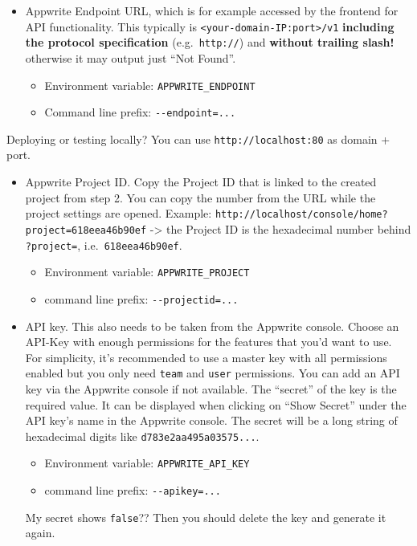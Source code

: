 \documentclass[
]{article}
\providecommand{\tightlist}{%
  \setlength{\itemsep}{0pt}\setlength{\parskip}{0pt}}
\begin{document}
\begin{itemize}
\item
  Appwrite Endpoint URL, which is for example accessed by the frontend
  for API functionality. This typically is
  \texttt{\textless{}your-domain-IP:port\textgreater{}/v1}
  \textbf{including the protocol specification} (e.g.~\texttt{http://})
  and \textbf{without trailing slash!} otherwise it may output just
  ``Not Found''.

  \begin{itemize}
  \tightlist
  \item
    Environment variable: \texttt{APPWRITE\_ENDPOINT}
  \item
    Command line prefix: \texttt{-\/-endpoint=...}
  \end{itemize}
\end{itemize}

Deploying or testing locally? You can use \texttt{http://localhost:80}
as domain + port.

\begin{itemize}
\item
  Appwrite Project ID. Copy the Project ID that is linked to the created
  project from step 2. You can copy the number from the URL while the
  project settings are opened. Example:
  \texttt{http://localhost/console/home?project=618eea46b90ef}
  -\textgreater{} the Project ID is the hexadecimal number behind
  \texttt{?project=}, i.e.~\texttt{618eea46b90ef}.

  \begin{itemize}
  \tightlist
  \item
    Environment variable: \texttt{APPWRITE\_PROJECT}
  \item
    command line prefix: \texttt{-\/-projectid=...}
  \end{itemize}
\item
  API key. This also needs to be taken from the Appwrite console. Choose
  an API-Key with enough permissions for the features that you'd want to
  use. For simplicity, it's recommended to use a master key with all
  permissions enabled but you only need \texttt{team} and \texttt{user}
  permissions. You can add an API key via the Appwrite console if not
  available. The ``secret'' of the key is the required value. It can be
  displayed when clicking on ``Show Secret'' under the API key's name in
  the Appwrite console. The secret will be a long string of hexadecimal
  digits like \texttt{d783e2aa495a03575...}.

  \begin{itemize}
  \tightlist
  \item
    Environment variable: \texttt{APPWRITE\_API\_KEY}
  \item
    command line prefix: \texttt{-\/-apikey=...}
  \end{itemize}

  My secret shows \texttt{false}?? Then you should delete the key and
  generate it again.
\end{itemize}
\end{document}
